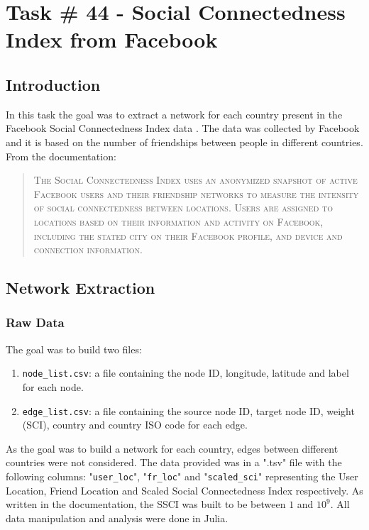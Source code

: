 \chapter{Task \# 44 - Social Connectedness Index  from Facebook}

\section{Introduction}
In this task the goal was to extract a network for each country present in the Facebook Social Connectedness Index data \cite{FacebookSocialConnectednessIndexData}.
The data was collected by Facebook and it is based on the number of friendships between people in different countries.
From the documentation:
\begin{quote}
\textsc{The Social Connectedness Index uses an anonymized snapshot of active Facebook users and their friendship networks to measure the intensity of social connectedness between locations. Users are assigned to locations based on their information and activity on Facebook, including the stated city on their Facebook profile, and device and connection information.
}\end{quote}

\section{Network Extraction}
\subsection{Raw Data}
The goal was to build two files:
\begin{enumerate}
    \item \texttt{node\_list.csv}: a file containing the node ID, longitude, latitude and label for each node.
    \item \texttt{edge\_list.csv}: a file containing the source node ID, target node ID, weight (SCI), country and country ISO code for each edge.
\end{enumerate}
As the goal was to build a network for each country, edges between different countries were not considered.
The data provided was in a ".tsv" file with the following columns: "\texttt{user\_loc}", "\texttt{fr\_loc}" and "\texttt{scaled\_sci}" representing the User Location, Friend Location and Scaled Social Connectedness Index respectively.
As written in the documentation, the SSCI was built to be between $1$ and $10^9$.
All data manipulation and analysis were done in Julia\cite{julia}.

